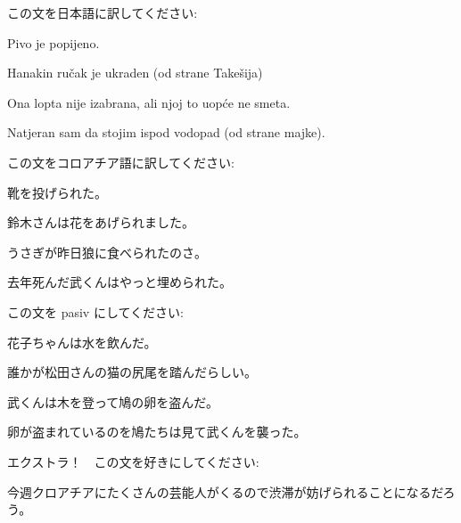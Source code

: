 
\author{Katja Kržišnik}

	
	\begin{mondai}{この文を日本語に訳してください:}
		\item Pivo je popijeno.
		\item Hanakin ručak je ukraden (od strane Takešija)
		\item Ona lopta nije izabrana, ali njoj to uopće ne smeta.
		\item Natjeran sam da stojim ispod vodopad (od strane majke). 
	\end{mondai}{}
	
	\begin{mondai}{この文をコロアチア語に訳してください:}
		\item 靴を投げられた。 
		\item 鈴木さんは花をあげられました。
		\item うさぎが昨日狼に食べられたのさ。
		\item 去年死んだ武くんはやっと埋められた。
	\end{mondai}
	
	\begin{mondai}{この文を pasiv にしてください:}
		\item 花子ちゃんは水を飲んだ。
		\item 誰かが松田さんの猫の尻尾を踏んだらしい。
		\item 武くんは木を登って鳩の卵を盗んだ。
		\item 卵が盗まれているのを鳩たちは見て武くんを襲った。
	\end{mondai}
	
	\begin{mondai}{ エクストラ！　この文を好きにしてください: }
		\item 今週クロアチアにたくさんの芸能人がくるので渋滞が妨げられることになるだろう。  
	\end{mondai}
